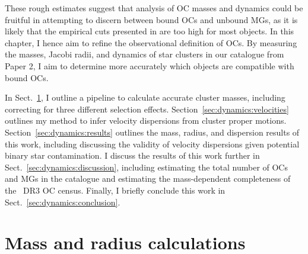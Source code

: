 These rough estimates suggest that analysis of OC masses and dynamics could be fruitful in attempting to discern between bound OCs and unbound MGs, as it is likely that the empirical cuts presented in \cite{cantat-gaudin_clusters_2020} are too high for most objects. In this chapter, I hence aim to refine the observational definition of OCs. By measuring the masses, Jacobi radii, and dynamics of star clusters in our catalogue from Paper 2, I aim to determine more accurately which objects are compatible with bound OCs. 

In Sect.~\ref{sec:dynamics:masses}, I outline a pipeline to calculate accurate cluster masses, including correcting for three different selection effects. Section~\ref{sec:dynamics:velocities} outlines my method to infer velocity dispersions from cluster proper motions. Section~\ref{sec:dynamics:results} outlines the mass, radius, and dispersion results of this work, including discussing the validity of velocity dispersions given potential binary star contamination. I discuss the results of this work further in Sect.~\ref{sec:dynamics:discussion}, including estimating the total number of OCs and MGs in the catalogue and estimating the mass-dependent completeness of the \gaia\ DR3 OC census. Finally, I briefly conclude this work in Sect.~\ref{sec:dynamics:conclusion}.



\section{Mass and radius calculations}
\label{sec:dynamics:masses}

